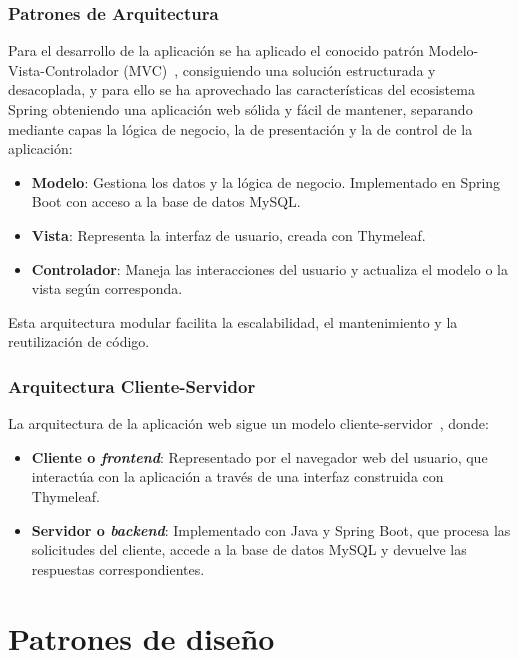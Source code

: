 \subsubsection{Patrones de Arquitectura}
Para el desarrollo de la aplicación se ha aplicado el conocido patrón Modelo-Vista-Controlador (MVC)~\cite{modelo-vista-controrlador}, consiguiendo una solución estructurada y desacoplada, y para ello se ha aprovechado las características del ecosistema Spring obteniendo una aplicación web sólida y fácil de mantener, separando mediante capas la lógica de negocio, la de presentación y la de control de la aplicación:
\begin{itemize}
\tightlist
   \item \textbf{Modelo}: Gestiona los datos y la lógica de negocio. Implementado en Spring Boot con acceso a la base de datos MySQL.
   \item \textbf{Vista}: Representa la interfaz de usuario, creada con Thymeleaf.
   \item \textbf{Controlador}: Maneja las interacciones del usuario y actualiza el modelo o la vista según corresponda.
\end{itemize}
Esta arquitectura modular facilita la escalabilidad, el mantenimiento y la reutilización de código.

\newpage

\subsubsection{Arquitectura Cliente-Servidor}
La arquitectura de la aplicación web sigue un modelo cliente-servidor~\cite{client-server-model}, donde:
\begin{itemize}
\tightlist
   \item \textbf{Cliente o \emph{frontend}}: Representado por el navegador web del usuario, que interactúa con la aplicación a través de una interfaz construida con Thymeleaf.
   \item \textbf{Servidor o \emph{backend}}: Implementado con Java y Spring Boot, que procesa las solicitudes del cliente, accede a la base de datos MySQL y devuelve las respuestas correspondientes.
\end{itemize}

\section{Patrones de diseño}\label{patron-de-diseño}


